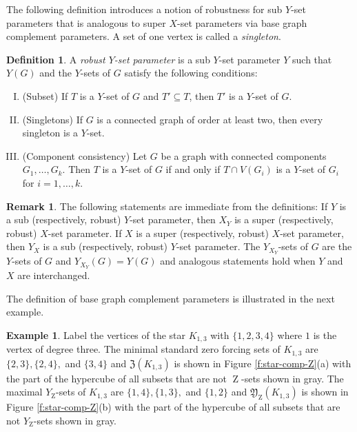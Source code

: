\documentclass{article}
\numberwithin{figure}{section}
\numberwithin{table}{section}
\numberwithin{equation}{section}
\theoremstyle{definition}
\newtheorem{rem}[thm]{Remark}
\theoremstyle{definition}
\newtheorem{defn}[thm]{Definition}
\theoremstyle{definition}
\newtheorem{ex}[thm]{Example}
\newcommand{\ben}{\begin{enumerate}}
\newcommand{\een}{\end{enumerate}}
\newcommand{\Z}{\operatorname{Z}}
\newcommand{\ztar}{\mathfrak{Z}}%
\newcommand{\ytar}{\mathfrak{Y}}
\begin{document}
{The following definition introduces a notion of robustness for sub $Y$-set parameters that is analogous to super $X$-set parameters  via base graph complement parameters. A  set of one vertex is called a \emph{singleton}. %


\begin{defn}\label{Robust-parameters-Y}
A \emph{robust  $Y$-set parameter} is a sub $Y$-set parameter $Y$  such that $Y(G)$ and  the $Y$-sets of $G$ satisfy the following conditions:  
\ben[(I)]
\item\label{y:sub} (Subset)
If $T$ is a $Y$-set of $G$ and $T'\subseteq T$, then $T'$ is a $Y$-set of $G$.
\item\label{y:n-1} 
(Singletons)
If $G$ is a connected graph of order  at least two, %
then every singleton is a $Y$-set. 
\item \label{y:component}
(Component consistency) 
Let $G$ be a graph with connected components $G_1,\ldots,G_k$.  Then $T$ is a $Y$-set of $G$ if and only if $T\cap V(G_i)$ is a $Y$-set of $G_i$ for $i=1,\dots,k$.
\een  
\end{defn}


\begin{rem}\label{p:comp-params} The following statements are  immediate from the definitions:   If  $Y$ is a sub (respectively, robust) $Y$-set parameter, then $X_Y$ is a super (respectively, robust) $X$-set parameter.
If $X$ is a super (respectively, robust) $X$-set parameter, then $Y_X$ is a sub (respectively, robust) $Y$-set parameter.
The $Y_{X_Y}$-sets of $G$ are the $Y$-sets of $G$ and $Y_{X_Y}(G)=Y(G)$ and analogous statements hold when $Y$ and $X$ are interchanged. 
\end{rem}

 The definition of base graph complement  parameters  is illustrated in the next example.

\begin{ex}\label{ex:star-Ztar-Y_Ztar}
  Label the vertices of the star $K_{1,3}$ with  $\{1,2,3,4\}$ where $1$ is the vertex of degree three. The minimal standard zero forcing sets of $K_{1,3}$ are  $\{2,3\}, \{2,4\},$ and $\{3,4\}$ and $\ztar(K_{1,3})$ is shown in Figure \ref{f:star-comp-Z}(a) with the part of the hypercube of all subsets that are not $\Z$-sets shown in gray.  The maximal $Y_{\Z}$-sets of $K_{1,3}$ are $\{1,4\}, \{1,3\},$ and $\{1,2\}$ and $\ytar_{\Z}(K_{1,3})$ is shown in Figure \ref{f:star-comp-Z}(b) with the part of the hypercube of all subsets that are not $Y_{\Z}$-sets shown in gray. 
\end{ex}

}
\end{document}
